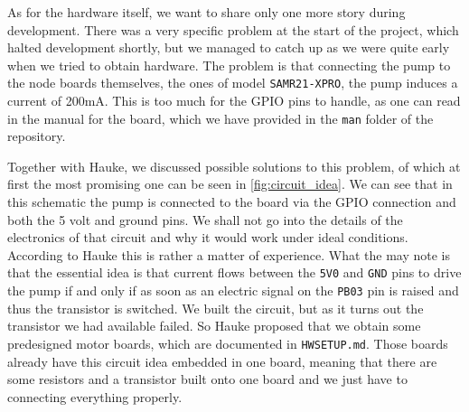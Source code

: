\documentclass[acmtog, language=english, nonacm]{acmart}
\begin{document}
    As for the hardware itself, we want to share only one more story during development. There was a very specific problem at the start of the project, which halted development shortly, but we managed to catch up as we were quite early when we tried to obtain hardware. The problem is that connecting the pump to the node boards themselves, the ones of model \texttt{SAMR21-XPRO}, the pump induces a current of 200mA. This is too much for the GPIO pins to handle, as one can read in the manual for the board, which we have provided in the \texttt{man} folder of the repository.

    Together with Hauke, we discussed possible solutions to this problem, of which at first the most promising one can be seen in \cref{fig:circuit_idea}. We can see that in this schematic the pump is connected to the board via the GPIO connection and both the 5 volt and ground pins. We shall not go into the details of the electronics of that circuit and why it would work under ideal conditions. According to Hauke this is rather a matter of experience. What the may note is that the essential idea is that current flows between the \texttt{5V0} and \texttt{GND} pins to drive the pump if and only if as soon as an electric signal on the \texttt{PB03} pin is raised and thus the transistor is switched. We built the circuit, but as it turns out the transistor we had available failed. So Hauke proposed that we obtain some predesigned motor boards, which are documented in \texttt{HWSETUP.md}. Those boards already have this circuit idea embedded in one board, meaning that there are some resistors and a transistor built onto one board and we just have to connecting everything properly.
\end{document}
